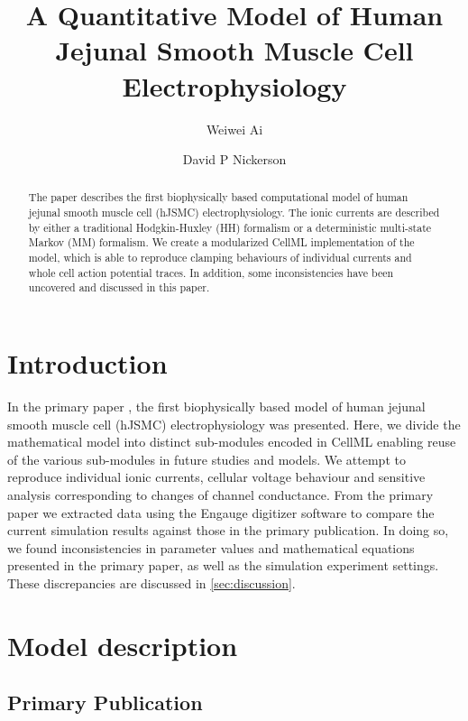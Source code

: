 \documentclass[fleqn,10pt]{physiome}
\title{A Quantitative Model of Human Jejunal Smooth Muscle Cell Electrophysiology}
\author[1][weiwei.ai@auckland.ac.nz]{Weiwei Ai}
\author[1]{David P Nickerson}
\affil[1]{Auckland Bioengineering Institute, University of Auckland, New Zealand}
\begin{document}
\maketitle

\begin{abstract}
The \citet{poh2012quantitative} paper describes the first biophysically based computational model of human jejunal smooth muscle cell (hJSMC) electrophysiology. The ionic currents are described by either a traditional Hodgkin-Huxley (HH) formalism or a deterministic multi-state Markov (MM) formalism. We create a modularized CellML implementation of the model, which is able to reproduce clamping behaviours of individual currents and whole cell action potential traces. In addition, some inconsistencies have been uncovered and discussed in this paper.
\end{abstract}



\section{Introduction}

In the primary paper \citep{poh2012quantitative}, the first biophysically based model of human jejunal smooth muscle cell (hJSMC) electrophysiology was presented. Here, we divide the mathematical model into distinct sub-modules encoded in CellML enabling reuse of the various sub-modules in future studies and models. We attempt to reproduce individual ionic currents, cellular voltage behaviour and sensitive analysis corresponding to changes of channel conductance. From the primary paper we extracted data using the Engauge digitizer software \citep{mitchell_markummitchellengauge-digitizer_2020} to compare the current simulation results against those in the primary publication. In doing so, we found inconsistencies in parameter values and mathematical equations presented in the primary paper, as well as the simulation experiment settings. These discrepancies are discussed in \autoref{sec:discussion}.

\section{Model description}
\label{sed:modelDescription}

\subsection{Primary Publication}
\end{document}
